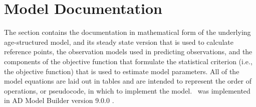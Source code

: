 \section{Model Documentation}
\begin{multicols}{2}
The section contains the documentation in mathematical form of the underlying age-structured model, and its steady state version that is used to calculate reference points, the observation models used in predicting observations, and the components of the objective function that formulate the statistical criterion (i.e., the objective function) that is used to estimate model parameters.  All of the model equations are laid out in tables and are intended to represent the order of operations, or pseudocode, in which to implement the model.  \iscam\ was implemented in AD Model Builder version 9.0.0 \citep{otterResearch,ADMB2009}.
\end{multicols}

